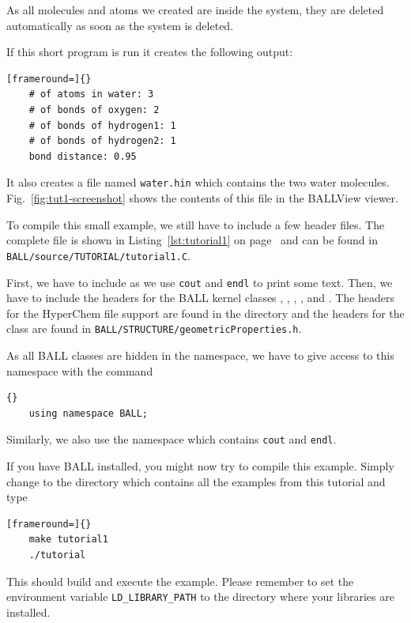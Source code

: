 % 

\noindent 
As all molecules and atoms we created are inside the system, they are deleted
automatically as soon as the system is deleted.

If this short program is run it creates the following output:

\begin{lstlisting}[frameround=]{}
	# of atoms in water: 3
	# of bonds of oxygen: 2
	# of bonds of hydrogen1: 1
	# of bonds of hydrogen2: 1
	bond distance: 0.95
\end{lstlisting}

\noindent
It also creates a file named {\tt water.hin} which contains the two water
molecules. Fig.~\ref{fig:tut1-screenshot} shows the contents of this file
in the BALLView viewer.

To compile this small example, we still have to include a few header files.
The complete file is shown in Listing~\ref{lst:tutorial1} on
page~\pageref{lst:tutorial1} and can be found in \mbox{{\tt
BALL/source/TUTORIAL/tutorial1.C}}.

First, we have to include  as we use {\tt cout} and {\tt endl}
to print some text. Then, we have to include the headers for the BALL kernel
classes , , , , and
. The headers for the HyperChem file support are found in the
directory  and the headers for the
 class are found in
{\tt BALL/STRUCTURE/geometricProperties.h}.

As all BALL classes are hidden in the  namespace, we have to
give access to this namespace with the command 
\begin{lstlisting}{}
	using namespace BALL;
\end{lstlisting}
Similarly, we also use the namespace  which contains {\tt cout}
and {\tt endl}.

If you have BALL installed, you might now try to compile this example. Simply
change to the directory  which contains all
the examples from this tutorial and type 
\begin{lstlisting}[frameround=]{}
	make tutorial1
	./tutorial
\end{lstlisting}
This should build and execute the example. Please remember to set the
environment variable {\tt LD\_LIBRARY\_PATH} to the directory where your
libraries are installed.

